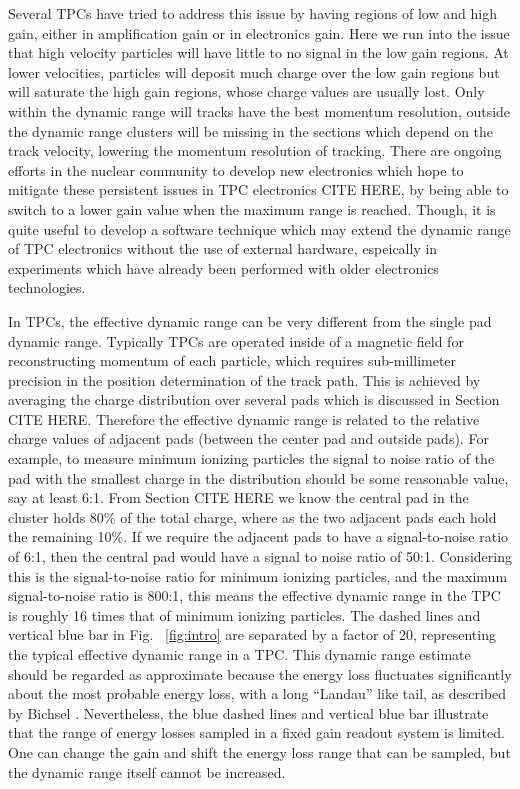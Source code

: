 Several TPCs have tried to address this issue by having regions of low and high gain, either in amplification gain or in electronics gain. Here we run into the issue that high velocity particles will have little to no signal in the low gain regions. At lower velocities, particles will deposit much charge over the low gain regions but will saturate the high gain regions, whose charge values are usually lost. Only within the dynamic range will tracks have the best momentum resolution, outside the dynamic range clusters will be missing in the sections which depend on the track velocity, lowering the momentum resolution of tracking. There are ongoing efforts in the nuclear community to develop new electronics which hope to mitigate these persistent issues in TPC electronics CITE HERE, by being able to switch to a lower gain value when the maximum range is reached. Though, it is quite useful to develop a software technique which may extend the dynamic range of TPC electronics without the use of external hardware, espeically in experiments which have already been performed with older electronics technologies. 

In TPCs, the effective dynamic range can be very different from the single pad dynamic range. Typically TPCs are operated inside of a magnetic field for reconstructing momentum of each particle, which requires sub-millimeter precision in the position determination of the track path. This is achieved by averaging the charge distribution over several pads which is discussed in Section CITE HERE. Therefore the effective dynamic range is related to the relative charge values of adjacent pads (between the center pad and outside pads). For example, to measure minimum ionizing particles the signal to noise ratio of the pad with the smallest charge in the distribution should be some reasonable value, say at least 6:1. From Section CITE HERE we know the central pad in the cluster holds 80\% of the total charge, where as the two adjacent pads each hold the remaining 10\%. If we require the adjacent pads to have a signal-to-noise ratio of 6:1, then the central pad would have a signal to noise ratio of 50:1. Considering this is the signal-to-noise ratio for minimum ionizing particles, and the maximum signal-to-noise ratio is 800:1, this means the effective dynamic range in the TPC is roughly 16 times that of minimum ionizing particles. The dashed lines and vertical blue bar in Fig.~ \ref{fig:intro} are separated by a factor of 20, representing the typical effective dynamic range in a TPC. This dynamic range estimate should be regarded as approximate because the energy loss fluctuates significantly about the most probable energy loss, with a long ``Landau'' like tail, as described by Bichsel \cite{bichsel}. Nevertheless, the blue dashed lines and vertical blue bar illustrate that the range of energy losses sampled in a fixed gain readout system is limited. One can change the gain and shift the energy loss range that can be sampled, but the dynamic range itself cannot be increased.

